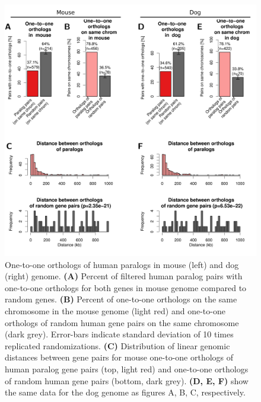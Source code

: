 \documentclass[a4paper,twoside=true,openright,parskip=full,chapterprefix=true,11pt,headings=normal,bibliography=totoc,listof=totoc,titlepage=on,captions=tableabove,draft=false]{scrreprt}
\theoremstyle{definition}
\theoremstyle{definition}
\theoremstyle{definition}
\theoremstyle{remark}
\begin{document}
\begin{figure}

{\centering \includegraphics[width=0.5\linewidth]{figures/paralog/SI/figS13} 

}

\caption{One-to-one orthologs of human paralogs in mouse
(left) and dog (right) genome. \textbf{(A)} Percent of filtered human
paralog pairs with one-to-one orthologs for both genes in mouse genome
compared to random genes. \textbf{(B)} Percent of one-to-one orthologs
on the same chromosome in the mouse genome (light red) and one-to-one
orthologs of random human gene pairs on the same chromosome (dark grey).
Error-bars indicate standard deviation of 10 times replicated
randomizations. \textbf{(C)} Distribution of linear genomic distances
between gene pairs for mouse one-to-one orthologs of human paralog gene
pairs (top, light red) and one-to-one orthologs of random human gene
pairs (bottom, dark grey). \textbf{(D, E, F)} show the same data for the
dog genome as figures A, B, C, respectively.}\label{fig:orthologsSpecies}
\end{figure}
\end{document}
